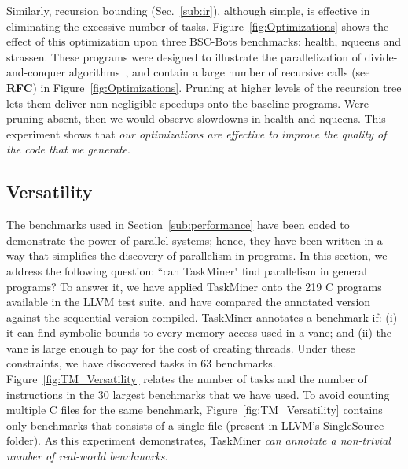 \documentclass[sigplan,10pt,screen]{acmart}
\newcommand\Taskminer{\mbox{\textsf{TaskMiner}}}
\begin{document}
Similarly, recursion bounding (Sec.~\ref{sub:ir}), although
simple, is effective in eliminating the excessive number of tasks.
Figure~\ref{fig:Optimizations} shows the effect of this optimization upon
three \textsf{BSC-Bots} benchmarks: \textsf{health}, \textsf{nqueens} and
\textsf{strassen}.
These programs were designed to illustrate the parallelization of
divide-and-conquer algorithms~\cite{Duran09}, and contain a large number of
recursive calls (see \textbf{RFC}) in Figure~\ref{fig:Optimizations}.
Pruning at higher levels of the recursion tree lets them deliver
non-negligible speedups onto the baseline programs.
Were pruning absent, then we would observe slowdowns in \textsf{health}
and \textsf{nqueens}.
This experiment shows that {\em our optimizations are effective to
improve the quality of the code that we generate}.

\subsection{Versatility}
\label{sub:versatility}

The benchmarks used in Section~\ref{sub:performance} have been coded to
demonstrate the power of parallel systems; hence, they have
been written in a way that simplifies the discovery of parallelism in programs.
In this section, we address the following question: ``can \Taskminer" find
parallelism in general programs?
To answer it, we have applied \Taskminer{} onto the 219 C programs available in
the LLVM test suite, and have compared the annotated version
against the sequential version compiled.
\Taskminer{} annotates a benchmark if:
(i) it can find symbolic bounds to every
memory access used in a vane; and
(ii) the vane is large enough to pay for the cost of creating threads.
Under these constraints, we have discovered tasks in 63 benchmarks.
Figure~\ref{fig:TM_Versatility} relates the number of tasks and the number of
instructions in the 30 largest benchmarks that we have used.
To avoid counting multiple C files for the same benchmark,
Figure~\ref{fig:TM_Versatility} contains only benchmarks that
consists of a single file (present in LLVM's \textsf{SingleSource} folder).
As this experiment demonstrates, \Taskminer{} {\em can annotate a non-trivial
number of real-world benchmarks}.
\end{document}
